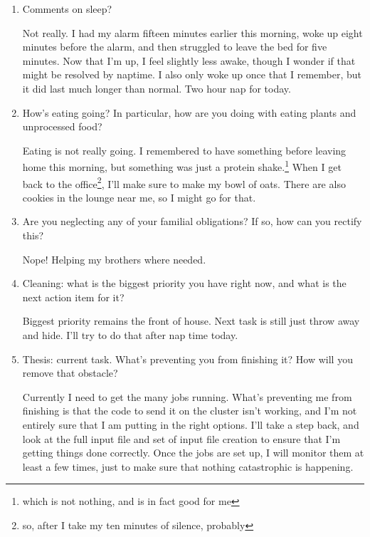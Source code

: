 \documentclass[12pt]{article}
\renewcommand{\,}{\textsuperscript{,}}
\begin{document}
\begin{enumerate}
Right now the tension is mostly in my neck and upper shoulders, and i think that neck rolls would help to fix it. I'll do that during the five minutes of silence.\footnote{ugh that does mean I should add five minutes of listening to my body. Ten minutes is still an appropriate amount of time to spend on tasks}

Oh also I keep wanting to cross my legs, which is not great. I don't know if that's habit or hips.

\item Comments on sleep?

Not really. I had my alarm fifteen minutes earlier this morning, woke up eight minutes before the alarm, and then struggled to leave the bed for five minutes.  
Now that I'm up, I feel slightly less awake, though I wonder if that might be resolved by naptime.  
I also only woke up once that I remember, but it did last much longer than normal.  
Two hour nap for today.

\item How's eating going? In particular, how are you doing with eating plants and unprocessed food?

Eating is not really going.  
I remembered to have something before leaving home this morning, but something was just a protein shake.\footnote{which is not nothing, and is in fact good for me}  
When I get back to the office\footnote{so, after I take my ten minutes of silence, probably}, I'll make sure to make my bowl of oats.  
There are also cookies in the lounge near me, so I might go for that.

\item Are you neglecting any of your familial obligations? If so, how can you rectify this?

Nope! Helping my brothers where needed.

\item Cleaning: what is the biggest priority you have right now, and what is the next action item for it?

Biggest priority remains the front of house.  
Next task is still just throw away and hide. I'll try to do that after nap time today.

\item Thesis: current task. What's preventing you from finishing it? How will you remove that obstacle?

Currently I need to get the many jobs running.  
What's preventing me from finishing is that the code to send it on the cluster isn't working, and I'm not entirely sure that I am putting in the right options.  
I'll take a step back, and look at the full input file and set of input file creation to ensure that I'm getting things done correctly.  
Once the jobs are set up, I will monitor them at least a few times, just to make sure that nothing catastrophic is happening.


\end{enumerate}
\end{document}
